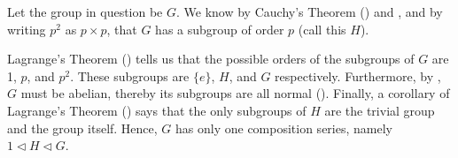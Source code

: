 \begin{questions}
    \item Let the group in question be $G$. We know by Cauchy's Theorem () and , and by writing $p^2$ as $p \times p$, that $G$ has a subgroup of order $p$ (call this $H$).

    Lagrange's Theorem () tells us that the possible orders of the subgroups of $G$ are 1, $p$, and $p^2$. These subgroups are $\{e\}$, $H$, and $G$ respectively. Furthermore, by , $G$ must be abelian, thereby its subgroups are all normal (). Finally, a corollary of Lagrange's Theorem () says that the only subgroups of $H$ are the trivial group and the group itself. Hence, $G$ has only one composition series, namely $1 \lhd H \lhd G$.
\end{questions}


